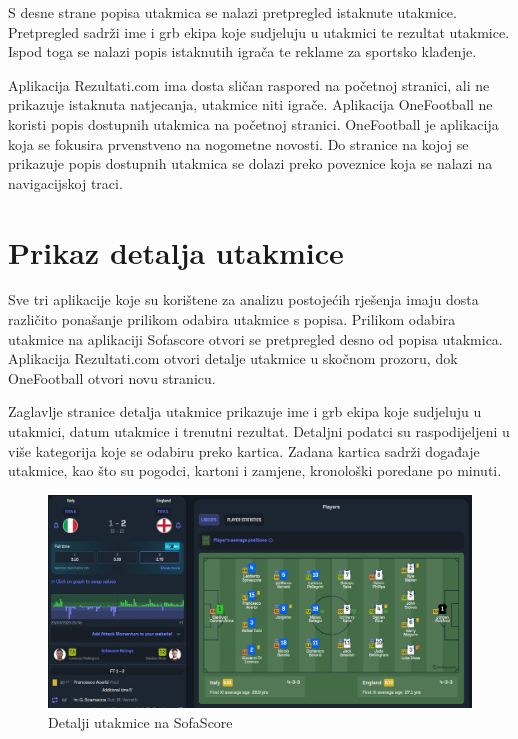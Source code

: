 \documentclass[times, utf8, zavrsni]{fer}
\begin{document}
S desne strane popisa utakmica se nalazi pretpregled istaknute utakmice. Pretpregled sadrži ime i grb ekipa koje sudjeluju u utakmici te rezultat utakmice.
Ispod toga se nalazi popis istaknutih igrača te reklame za sportsko klađenje.

Aplikacija Rezultati.com ima dosta sličan raspored na početnoj stranici, ali ne prikazuje istaknuta natjecanja, utakmice niti igrače.
Aplikacija OneFootball ne koristi popis dostupnih utakmica na početnoj stranici. OneFootball je aplikacija koja se fokusira prvenstveno na nogometne novosti.
Do stranice na kojoj se prikazuje popis dostupnih utakmica se dolazi preko poveznice koja se nalazi na navigacijskoj traci.

\section{Prikaz detalja utakmice}

Sve tri aplikacije koje su korištene za analizu postojećih rješenja imaju dosta različito ponašanje prilikom odabira utakmice s popisa.
Prilikom odabira utakmice na aplikaciji Sofascore otvori se pretpregled desno od popisa utakmica.
Aplikacija Rezultati.com otvori detalje utakmice u skočnom prozoru, dok OneFootball otvori novu stranicu.

Zaglavlje stranice detalja utakmice prikazuje ime i grb ekipa koje sudjeluju u utakmici, datum utakmice i trenutni rezultat.
Detaljni podatci su raspodijeljeni u više kategorija koje se odabiru preko kartica. Zadana kartica sadrži događaje utakmice, kao što su pogodci, kartoni i zamjene, kronološki poredane po minuti.

\begin{figure}[htb]
\centering
\includegraphics[width=15cm]{images/ss-detail.jpg}
\caption{Detalji utakmice na SofaScore}
\label{fig:ss-detail}
\end{figure}
\end{document}
